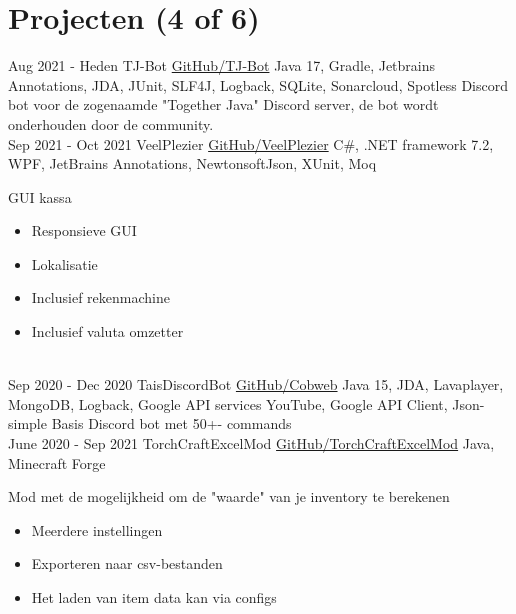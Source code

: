 \documentclass[letterpaper]{twentysecondcv} %
\begin{document}
    \section{Projecten (4 of 6)}
    \begin{twenty} %
        \twentyitem
        {Aug 2021 -}
        {Heden}
        {TJ-Bot}
        {\href{https://github.com/Together-Java/TJ-Bot/}{GitHub/TJ-Bot}}
        {Java 17, Gradle, Jetbrains Annotations, JDA, JUnit, SLF4J, Logback, SQLite, Sonarcloud, Spotless}
        {Discord bot voor de zogenaamde "Together Java" Discord server, de bot wordt onderhouden door de community.}\\
        \twentyitem
        {Sep 2021 -}
        {Oct 2021}
        {VeelPlezier}
        {\href{https://github.com/Tais993/VeelPlezier}{GitHub/VeelPlezier}}
        {C\#, .NET framework 7.2, WPF, JetBrains Annotations, NewtonsoftJson, XUnit, Moq}
        {
            GUI kassa
            \begin{itemize}
                \item Responsieve GUI
                \item Lokalisatie
                \item Inclusief rekenmachine
                \item Inclusief valuta omzetter
            \end{itemize}}\\
        \twentyitem
        {Sep 2020 -}
        {Dec 2020}
        {TaisDiscordBot}
        {\href{https://github.com/Tais993/taisdiscordbot}{GitHub/Cobweb}}
        {Java 15, JDA, Lavaplayer, MongoDB, Logback, Google API services YouTube, Google API Client, Json-simple}
        {Basis Discord bot met 50+- commands}\\
        \twentyitem
        {June 2020 -}
        {Sep 2021}
        {TorchCraftExcelMod}
        {\href{https://github.com/Tais993/TorchCraftExcelMod}{GitHub/TorchCraftExcelMod}}
        {Java, Minecraft Forge}
        {
            Mod met de mogelijkheid om de "waarde" van je inventory te berekenen
            \begin{itemize}
                \item Meerdere instellingen
                \item Exporteren naar csv-bestanden
                \item Het laden van item data kan via configs
            \end{itemize}}\\
    \end{twenty}
\end{document}
